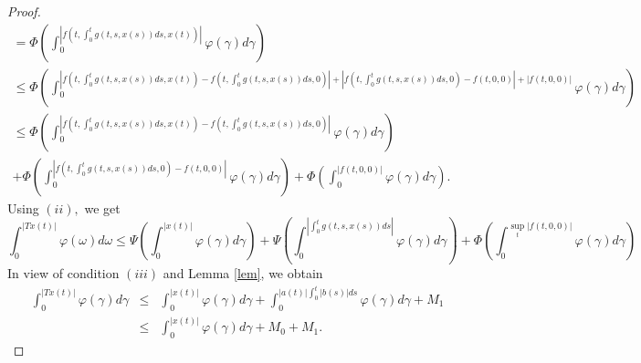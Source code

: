 \documentclass{amsart}
\theoremstyle{plain}
\numberwithin{equation}{section}
\begin{document}
\begin{proof}
\begin{multline*}
=\Phi \left( \int_{0}^{\left\vert f\left( t,\int_{0}^{t}g\left( t,s,x\left(
s\right) \right) ds,x\left( t\right) \right) \right\vert }\varphi \left(
\gamma \right) d\gamma \right) \\
\leqslant \Phi \left( \int_{0}^{\left\vert f\left( t,\int_{0}^{t}g\left(
t,s,x\left( s\right) \right) ds,x\left( t\right) \right) -f\left(
t,\int_{0}^{t}g\left( t,s,x\left( s\right) \right) ds,0\right) \right\vert
+\left\vert f\left( t,\int_{0}^{t}g\left( t,s,x\left( s\right) \right)
ds,0\right) -f\left( t,0,0\right) \right\vert +\left\vert f\left(
t,0,0\right) \right\vert }\varphi \left( \gamma \right) d\gamma \right) \\
\leqslant \Phi \left( \int_{0}^{\left\vert f\left( t,\int_{0}^{t}g\left(
t,s,x\left( s\right) \right) ds,x\left( t\right) \right) -f\left(
t,\int_{0}^{t}g\left( t,s,x\left( s\right) \right) ds,0\right) \right\vert
}\varphi \left( \gamma \right) d\gamma \right) \\
+\Phi \left( \int_{0}^{\left\vert f\left( t,\int_{0}^{t}g\left( t,s,x\left(
s\right) \right) ds,0\right) -f\left( t,0,0\right) \right\vert }\varphi
\left( \gamma \right) d\gamma \right) +\Phi \left( \int_{0}^{\left\vert
f\left( t,0,0\right) \right\vert }\varphi \left( \gamma \right) d\gamma
\right) .
\end{multline*}Using $\left( ii\right) ,$ we get\begin{equation*}
\int_{0}^{\left\vert Tx\left( t\right) \right\vert }\varphi \left( \omega
\right) d\omega \leqslant \Psi \left( \int_{0}^{\left\vert x\left( t\right)
\right\vert }\varphi \left( \gamma \right) d\gamma \right) +\Psi \left(
\int_{0}^{\left\vert \int_{0}^{t}g\left( t,s,x\left( s\right) \right)
ds\right\vert }\varphi \left( \gamma \right) d\gamma \right) +\Phi \left(
\int_{0}^{\sup\limits_{t}\left\vert f\left( t,0,0\right) \right\vert
}\varphi \left( \gamma \right) d\gamma \right)
\end{equation*}In view of condition $\left( iii\right) $ and Lemma \ref{lem}, we obtain\begin{eqnarray*}
\int_{0}^{\left\vert Tx\left( t\right) \right\vert }\varphi \left( \gamma
\right) d\gamma &\leqslant &\int_{0}^{\left\vert x\left( t\right)
\right\vert }\varphi \left( \gamma \right) d\gamma +\int_{0}^{\left\vert
a\left( t\right) \right\vert \int_{0}^{t}\left\vert b\left( s\right)
\right\vert ds}\varphi \left( \gamma \right) d\gamma +M_{1} \\
&\leqslant &\int_{0}^{\left\vert x\left( t\right) \right\vert }\varphi
\left( \gamma \right) d\gamma +M_{0}+M_{1}.
\end{eqnarray*}


\end{proof}
\end{document}
